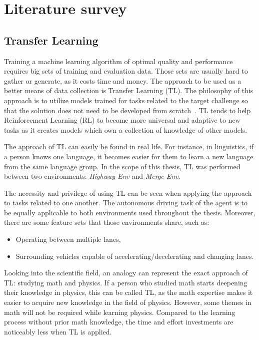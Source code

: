 \section{Literature survey}\label{chap:chap_2}

\subsection{Transfer Learning}\label{sec:subsec_2.2}

Training a machine learning algorithm of optimal quality and performance requires big sets of training and evaluation data. Those sets are usually hard to gather or generate, as it costs time and money. The approach to be used as a better means of data collection is Transfer Learning (TL). The philosophy of this approach is to utilize models trained for tasks related to the target challenge so that the solution does not need to be developed from scratch~\cite{Hosna2022}. TL tends to help Reinforcement Learning (RL) to become more universal and adaptive to new tasks as it creates models which own a collection of knowledge of other models. 

The approach of TL can easily be found in real life. For instance, in linguistics, if a person knows one language, it becomes easier for them to learn a new language from the same language group. In the scope of this thesis, TL was performed between two environments: \emph{Highway-Env} and \emph{Merge-Env}. 

The necessity and privilege of using TL can be seen when applying the approach to tasks related to one another. The autonomous driving task of the agent is to be equally applicable to both environments used throughout the thesis. Moreover, there are some feature sets that those environments share, such as:
\begin{itemize}
    \item Operating between multiple lanes,
    \item Surrounding vehicles capable of accelerating/decelerating and changing lanes.
\end{itemize}

Looking into the scientific field, an analogy can represent the exact approach of TL: studying math and physics. If a person who studied math starts deepening their knowledge in physics, this can be called TL, as the math expertise makes it easier to acquire new knowledge in the field of physics. However, some themes in math will not be required while learning physics. Compared to the learning process without prior math knowledge, the time and effort investments are noticeably less when TL is applied.

